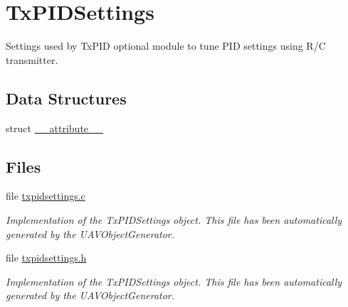 \hypertarget{group___tx_p_i_d_settings}{\section{\-Tx\-P\-I\-D\-Settings}
\label{group___tx_p_i_d_settings}
}


\-Settings used by \-Tx\-P\-I\-D optional module to tune \-P\-I\-D settings using \-R/\-C transmitter.  


\subsection*{\-Data \-Structures}
\begin{DoxyCompactItemize}
\item 
struct \hyperlink{struct____attribute____}{\-\_\-\-\_\-attribute\-\_\-\-\_\-}
\end{DoxyCompactItemize}
\subsection*{\-Files}
\begin{DoxyCompactItemize}
\item 
file \hyperlink{txpidsettings_8c}{txpidsettings.\-c}
\begin{DoxyCompactList}\small\item\em \-Implementation of the \-Tx\-P\-I\-D\-Settings object. \-This file has been automatically generated by the \-U\-A\-V\-Object\-Generator. \end{DoxyCompactList}\item 
file \hyperlink{txpidsettings_8h}{txpidsettings.\-h}
\begin{DoxyCompactList}\small\item\em \-Implementation of the \-Tx\-P\-I\-D\-Settings object. \-This file has been automatically generated by the \-U\-A\-V\-Object\-Generator. \end{DoxyCompactList}\end{DoxyCompactItemize}
